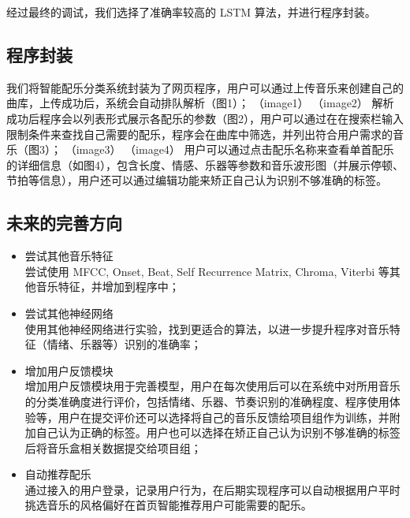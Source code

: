 \documentclass[a4paper,utf8,10pt]{article}
\begin{document}
经过最终的调试，我们选择了准确率较高的 LSTM 算法，并进行程序封装。

\subsection{程序封装}
我们将智能配乐分类系统封装为了网页程序，用户可以通过上传音乐来创建自己的曲库，上传成功后，系统会自动排队解析（图1）；
（image1） （image2）
解析成功后程序会以列表形式展示各配乐的参数（图2），用户可以通过在在搜索栏输入限制条件来查找自己需要的配乐，程序会在曲库中筛选，并列出符合用户需求的音乐（图3）；
（image3） （image4）
用户可以通过点击配乐名称来查看单首配乐的详细信息（如图4），包含长度、情感、乐器等参数和音乐波形图（并展示停顿、节拍等信息），用户还可以通过编辑功能来矫正自己认为识别不够准确的标签。


\subsection{未来的完善方向}
\noindent\begin{itemize}
\item 尝试其他音乐特征\\
尝试使用 MFCC, Onset, Beat, Self Recurrence Matrix, Chroma, Viterbi 等其他音乐特征，并增加到程序中；
\item 尝试其他神经网络\\
使用其他神经网络进行实验，找到更适合的算法，以进一步提升程序对音乐特征（情绪、乐器等）识别的准确率；
\item 增加用户反馈模块\\
增加用户反馈模块用于完善模型，用户在每次使用后可以在系统中对所用音乐的分类准确度进行评价，包括情绪、乐器、节奏识别的准确程度、程序使用体验等，用户在提交评价还可以选择将自己的音乐反馈给项目组作为训练，并附加自己认为正确的标签。用户也可以选择在矫正自己认为识别不够准确的标签后将音乐盒相关数据提交给项目组；
\item 自动推荐配乐\\
通过接入的用户登录，记录用户行为，在后期实现程序可以自动根据用户平时挑选音乐的风格偏好在首页智能推荐用户可能需要的配乐。
\end{itemize}

{}

\end{document}
